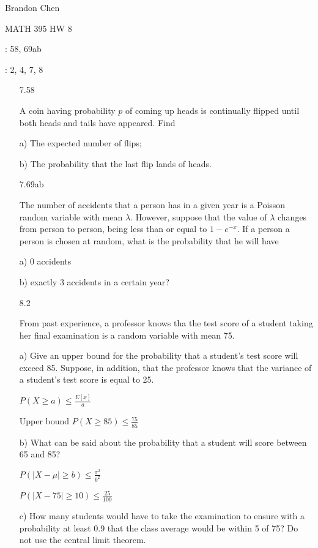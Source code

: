 \documentclass[11pt]{article}
\begin{document}
\noindent Brandon Chen

\noindent MATH 395 HW 8

: 58, 69ab

: 2, 4, 7, 8

\begin{itemize}

	\item[7.58]

		A coin having probability $p$ of coming up heads is
		continually flipped until both heads and tails have 
		appeared. Find

		a) The expected number of flips;

		b) The probability that the last flip lands of heads.

	\item[7.69ab]

		The number of accidents that a person has in a given year 
		is a Poisson random variable with mean $\lambda$. 
		However, suppose that the value of $\lambda$ changes 
		from person to person, being less than or equal to 
		$1 - e^{-x}$. If a person a person is chosen at random,
		what is the probability that he will have

		a) 0 accidents

		b) exactly 3 accidents in a certain year?

	\item[8.2]

		From past experience, a professor knows tha the test 
		score of a student taking her final examination is a 
		random variable with mean 75.

		a) Give an upper bound for the probability that a 
		student's test score will exceed 85. Suppose, 
		in addition, that the professor knows that the 
		variance of a student's test score is equal to 25.

		$P(X \geq a) \leq \frac{E[x]}{a}$

		Upper bound $P(X \geq 85) \leq \frac{75}{85}$

		b) What can be said about the probability that
		a student will score between 65 and 85?

		$P(|X-\mu| \geq b)  \leq \frac{\sigma^2}{b^2}$

		$P(|X-75| \geq 10) \leq \frac{25}{100}$

		c) How many students would have to take the 
		examination to ensure with a probability at least 0.9 
		that the class average would be within 5 of 75? 
		Do not use the central limit theorem.


\end{itemize}
\end{document}
